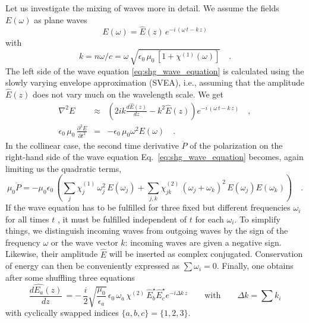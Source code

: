 Let us investigate the mixing of waves more in detail.
We assume the fields $E(\omega)$ as plane waves
\begin{equation}
  E(\omega) = \hat{E}(z) \, e^{-i \, (\omega \,
  t - k \, z)} 
\end{equation}
with
\begin{equation}
 k = n
  \omega / c = \omega \, \sqrt{\epsilon_0 \, \mu_0 \, [1+
  \chi^{(1)}(\omega)]} \quad.
\end{equation}
The left side of the wave equation
\ref{eq:shg_wave_equation} is calculated using the slowly varying envelope approximation (SVEA), i.e., assuming that 
 the amplitude $ \hat{E}(z)$ does not vary much on the wavelength scale. We get
\begin{eqnarray}
 \nabla^2 E & \approx &  \left( 2 i k \frac{d
 \hat{E}(z)}{dz} - k^2 \hat{E}(z) \right) e^{-i \, (\omega \,
  t - k \, z)}  \quad ,\label{eq:shg_nabla2E}\\
%
 \epsilon_0 \, \mu_0 \, \frac{\partial^2 E}{\partial t^2} &=& -   \epsilon_0 \,
 \mu_0 \omega^2 E(\omega)  \quad .\label{eq:shg_partial2E_t2}
\end{eqnarray}
%
In the collinear case, the second time derivative 
$\ddot{P}$ of the polarization on the right-hand side of the wave equation Eq.~\ref{eq:shg_wave_equation} becomes, again limiting us the quadratic terms, 
\begin{equation}
  \mu_0 \ddot{P} = - \mu_0 \epsilon_0 \, \left( \sum_j \chi^{(1)}_{j}\, \omega_j^2 \, E(\omega_j)
     + \sum_{j,k} \chi^{(2)}_{jk} \, (\omega_j + \omega_k)^2 \, E(\omega_j) E(\omega_k) \right) \quad .
     \label{eq:shg_ddot_p}
\end{equation}
If the wave equation  has to be fulfilled for
three fixed but different frequencies $\omega_i$ for all
times $t$ , it must be fulfilled independent of  $t$ for each
$\omega_i$. To simplify things, we distinguish 
incoming waves from outgoing waves by the sign of the
frequency $\omega$ or the wave vector $k$: 
incoming waves are given a negative sign.
Likewise, their amplitude $\hat{E}$ will be inserted as complex conjugated. Conservation of energy can then be conveniently expressed as $\sum
\omega_i = 0$. Finally, one obtains after some shuffling
 three
equations 
\begin{equation}
 \frac{d  \hat{E_a}(z)}{dz} \,
= %
- \, \frac{i}{2}   \sqrt{ \frac{\mu_0} {\epsilon_a}}\,\epsilon_0
  \, \omega_a \, \chi^{(2)} \, \hat{E}_b^{\star} \hat{E}_c^{\star}  e^{-i  \Delta k \, z}
  \qquad \text{with} \qquad \Delta k = \sum k_i
  \label{eq:shg_e_of_z_nl}
\end{equation}
with  cyclically swapped  indices
$\{a,b,c\} = \{1,2,3\} $.


